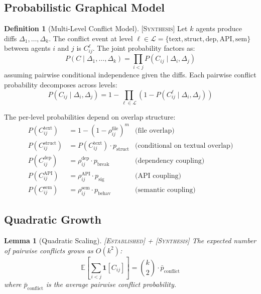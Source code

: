 \documentclass[11pt]{article}
\newtheorem{lemma}[theorem]{Lemma}
\theoremstyle{definition}
\newtheorem{definition}[theorem]{Definition}
\theoremstyle{remark}
\newcommand{\established}{\textsc{[Established]}}
\newcommand{\synthesis}{\textsc{[Synthesis]}}
\begin{document}
\subsection{Probabilistic Graphical Model}

\begin{definition}[Multi-Level Conflict Model] \synthesis{}
\label{def:conflict-pgm}
Let $k$ agents produce diffs $\Delta_1, \ldots, \Delta_k$.
The conflict event at level $\ell \in \mathcal{L} = \{\mathrm{text}, \mathrm{struct}, \mathrm{dep}, \mathrm{API}, \mathrm{sem}\}$ between agents $i$ and $j$ is $C_{ij}^\ell$.
The joint probability factors as:
\begin{equation}
  P(C \mid \Delta_1, \ldots, \Delta_k) = \prod_{i < j} P(C_{ij} \mid \Delta_i, \Delta_j)
\end{equation}
assuming pairwise conditional independence given the diffs.
Each pairwise conflict probability decomposes across levels:
\begin{equation}
  P(C_{ij} \mid \Delta_i, \Delta_j) = 1 - \prod_{\ell \in \mathcal{L}} \left(1 - P(C_{ij}^\ell \mid \Delta_i, \Delta_j)\right)
\end{equation}
\end{definition}

The per-level probabilities depend on overlap structure:
\begin{align}
  P(C_{ij}^{\mathrm{text}}) &= 1 - (1 - \rho_{ij}^{\mathrm{file}})^{m} & \text{(file overlap)} \\
  P(C_{ij}^{\mathrm{struct}}) &= P(C_{ij}^{\mathrm{text}}) \cdot p_{\mathrm{struct}} & \text{(conditional on textual overlap)} \\
  P(C_{ij}^{\mathrm{dep}}) &= \rho_{ij}^{\mathrm{dep}} \cdot p_{\mathrm{break}} & \text{(dependency coupling)} \\
  P(C_{ij}^{\mathrm{API}}) &= \rho_{ij}^{\mathrm{API}} \cdot p_{\mathrm{sig}} & \text{(API coupling)} \\
  P(C_{ij}^{\mathrm{sem}}) &= \rho_{ij}^{\mathrm{sem}} \cdot p_{\mathrm{behav}} & \text{(semantic coupling)}
\end{align}

\subsection{Quadratic Growth}

\begin{lemma}[Quadratic Scaling] \established{} + \synthesis{}
\label{lem:quadratic}
The expected number of pairwise conflicts grows as $O(k^2)$:
\begin{equation}
  \mathbb{E}\!\left[\sum_{i<j} \mathbf{1}[C_{ij}]\right] = \binom{k}{2} \cdot \bar{p}_{\mathrm{conflict}}
\end{equation}
where $\bar{p}_{\mathrm{conflict}}$ is the average pairwise conflict probability.
\end{lemma}
\end{document}
